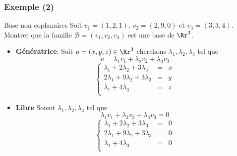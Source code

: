 \documentclass[dvipsnames]{beamer}
\begin{document}
\begin{frame}[t]
  \frametitle{Exemple (2)}
  
  \begin{block}{Base non coplanaires}
    \scriptsize
    Soit $v_1 = (1,2,1)$, $v_2 = (2,9,0)$ et $v_3 = (3,3,4)$. Montrer que la
    famille $\mathcal{B} = (v_1, v_2, v_3)$ est une base de $\Rr^3$.
  \end{block}
  \begin{itemize}
    \scriptsize
  \item \textbf{\alert{Génératrice}}: Soit $u=(x,y,z)\in \Rr^3$
    cherchons $\lambda_1,\lambda_2,\lambda_3$ tel que
    \begin{equation*}
      u = \lambda_1 v_1 + \lambda_2 v_2 +\lambda_3 v_3
    \end{equation*}
    \begin{equation*}
      \left\{
        \begin{array}{lll}
          \lambda_1  + 2\lambda_2 + 3\lambda_3 & = & x\\ 
          2\lambda_1  + 9\lambda_2 + 3\lambda_3 & = & y\\ 
          \lambda_1  +  4\lambda_3 & = & z\\ 
        \end{array}
      \right.
    \end{equation*}
  \item \textbf{\alert{Libre}} Soient $\lambda_1,\lambda_2,\lambda_3$ tel que 
    \begin{equation*}
      \lambda_1 v_1 + \lambda_2 v_2 + \lambda_3 v_3 = 0
    \end{equation*}
    \begin{equation*}
      \left\{
        \begin{array}{lll}
          \lambda_1  + 2\lambda_2 + 3\lambda_3 & = & 0\\ 
          2\lambda_1  + 9\lambda_2 + 3\lambda_3 & = & 0\\ 
          \lambda_1  +  4\lambda_3 & = & 0\\ 
        \end{array}
      \right.
    \end{equation*}
  \end{itemize}
\end{frame}
\end{document}
